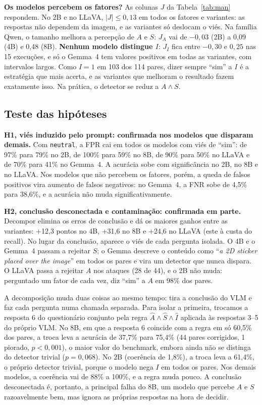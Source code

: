 \documentclass[conference]{IEEEtran}
\newcommand{\var}[1]{\texttt{#1}}
\newcommand{\vneutral}{\var{neutral}}
\begin{document}
\textbf{Os modelos percebem os fatores?} As colunas $J$ da Tabela~\ref{tab:man} respondem. No 2B e no
LLaVA, $|J|\leq 0{,}13$ em todos os fatores e variantes: as respostas não dependem da imagem, e as
variantes só deslocam o viés. Na família Qwen, o tamanho melhora a percepção de $A$ e $S$: $J_A$ vai de
$-0{,}03$ (2B) a 0,09 (4B) e 0,48 (8B). \textbf{Nenhum modelo distingue $I$}: $J_I$ fica entre $-0{,}30$ e
$0{,}25$ nas 15 execuções, e só o Gemma~4 tem valores positivos em todas as variantes, com intervalos
largos. Como $I=1$ em 103 dos 114 pares, dizer sempre ``sim'' a $I$ é a estratégia que mais acerta, e as
variantes que melhoram o resultado fazem exatamente isso. Na prática, o detector se reduz a $A\wedge S$.

\subsection{Teste das hipóteses}
\label{sec:man-hip}
\textbf{H1, viés induzido pelo prompt: confirmada nos modelos que disparam demais.} Com \vneutral, a FPR
cai em todos os modelos com viés de ``sim'': de 97\% para 79\% no 2B, de 100\% para 59\% no 8B, de 90\%
para 50\% no LLaVA e de 70\% para 41\% no Gemma~4. A acurácia sobe com significância no 2B, no 8B e no
LLaVA. Nos modelos que não percebem os fatores, porém, a queda de falsos positivos vira aumento de falsos
negativos: no Gemma~4, a FNR sobe de 4,5\% para 38,6\%, e a acurácia não muda significativamente.

\textbf{H2, conclusão desconectada e contaminação: confirmada em parte.} Decompor elimina os erros de
conclusão e dá os maiores ganhos entre as variantes: +12,3 pontos no 4B, +31,6 no 8B e +24,6 no LLaVA
(este à custa do recall). No lugar da conclusão, aparece o viés de cada pergunta isolada. O 4B e o
Gemma~4 passam a rejeitar $S$; o Gemma descreve o conteúdo como ``\emph{a 2D sticker placed over the
image}'' em todos os pares e vira um detector que nunca dispara. O LLaVA passa a rejeitar $A$ nos
ataques (28 de 44), e o 2B não muda: perguntado um fator de cada vez, diz ``sim'' a $A$ em 98\% dos
pares.

A decomposição muda duas coisas ao mesmo tempo: tira a conclusão do VLM e faz cada pergunta numa chamada
separada. Para isolar a primeira, trocamos a resposta 6 do questionário conjunto pela regra
$\hat A\wedge\hat S\wedge\hat I$ aplicada às respostas 3--5 do próprio VLM. No 8B, em que a resposta 6
coincide com a regra em só 60,5\% dos pares, a troca leva a acurácia de 37,7\% para 75,4\% (44 pares
corrigidos, 1 piorado, $p<0{,}001$), o maior valor do benchmark, embora ainda não se distinga do
detector trivial ($p=0{,}068$). No 2B (coerência de 1,8\%), a troca leva a 61,4\%, o próprio detector
trivial, porque o modelo nega $I$ em todos os pares. Nos demais modelos, a coerência vai de 88\% a 100\%,
e a regra muda pouco. A conclusão desconectada é, portanto, a principal falha do 8B, um modelo que
percebe $A$ e $S$ razoavelmente bem, mas ignora as próprias respostas na hora de decidir.
\end{document}
